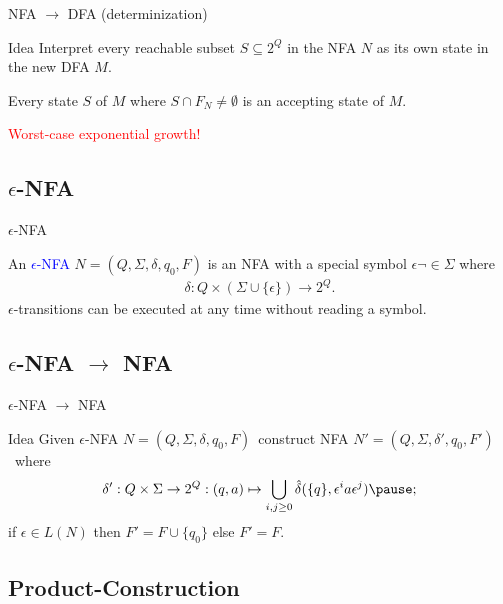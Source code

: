 \documentclass{beamer}
\def\padding{\vspace{0.5cm}}
\def\b{\textcolor{blue}}
\def\r{\textcolor{red}}
\begin{document}
\begin{frame}{NFA $\to$ DFA (determinization)}
    \begin{block}{Idea}
        Interpret every reachable subset $S \subseteq 2^Q$ in the NFA $N$ as its own state in the new DFA $M$.\pause\par
        Every state $S$ of $M$ where $S \cap F_N \neq \emptyset$ is an accepting state of $M$.
    \end{block}\pause\padding
    \r{Worst-case exponential growth!}
\end{frame}

\subsection{$\epsilon$-NFA}

\begin{frame}{$\epsilon$-NFA}
    \begin{definition}
        An \b{$\epsilon$-NFA} $N = (Q, \Sigma, \delta, q_0, F)$ is an NFA with a special symbol $\epsilon \neg\in \Sigma$ where
        \begin{align*}
            \delta : Q \times (\Sigma \cup \{\epsilon\}) \to 2^Q.
        \end{align*}\pause
        $\epsilon$-transitions can be executed at any time without reading a symbol.
    \end{definition}
\end{frame}

\subsection{$\epsilon$-NFA $\to$ NFA}

\begin{frame}{$\epsilon$-NFA $\to$ NFA}
    \begin{block}{Idea}
        Given $\epsilon$-NFA $N = (Q, \Sigma, \delta, q_0, F)$\pause\ construct NFA $N' = (Q, \Sigma, \delta', q_0, F')$\pause\ where
        \begin{align*}
            \delta' : Q \times \Sigma \to 2^Q : (q, a) \mapsto \bigcup_{i, j \geq 0} \hat{\delta}(\{q\}, \epsilon^i a \epsilon^j)\pause;
        \end{align*}
        if $\epsilon \in L(N)$ then $F' = F \cup \{q_0\}$ else $F' = F$.
    \end{block}
\end{frame}

\subsection{Product-Construction}
\end{document}
